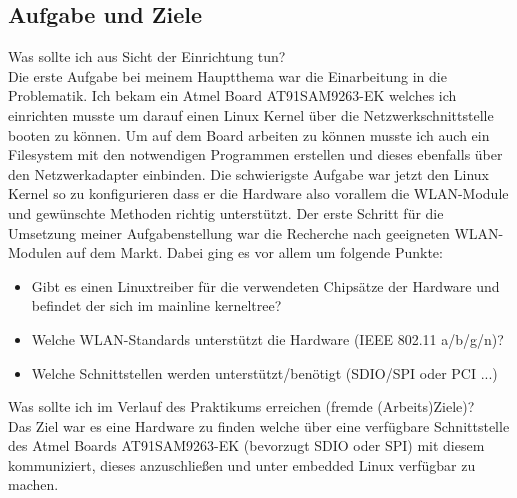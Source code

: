 \documentclass[pdftex,12pt,a4paper]{scrreprt}
\begin{document}
\subsection{Aufgabe und Ziele}
Was sollte ich aus Sicht der Einrichtung tun?\\
Die erste Aufgabe bei meinem Hauptthema war die Einarbeitung in die Problematik. Ich bekam ein Atmel Board AT91SAM9263-EK welches ich einrichten musste
um darauf einen Linux Kernel über die Netzwerkschnittstelle booten zu können. Um auf dem Board arbeiten zu können musste ich auch ein Filesystem mit den 
notwendigen Programmen erstellen und dieses ebenfalls über den Netzwerkadapter einbinden. Die schwierigste Aufgabe war jetzt den Linux Kernel so zu konfigurieren dass er die Hardware also vorallem die WLAN-Module und gewünschte Methoden richtig unterstützt.
Der erste Schritt für die Umsetzung meiner Aufgabenstellung war die Recherche nach geeigneten WLAN-Modulen auf dem Markt.
Dabei ging es vor allem um folgende Punkte:\\
\begin{itemize}
 \item Gibt es einen Linuxtreiber für die verwendeten Chipsätze der Hardware und befindet der sich im mainline kerneltree?
 \item Welche WLAN-Standards unterstützt die Hardware (IEEE 802.11 a/b/g/n)?
 \item Welche Schnittstellen werden unterstützt/benötigt (SDIO/SPI oder PCI ...)
\end{itemize}

Was sollte ich im Verlauf des Praktikums erreichen (fremde (Arbeits)Ziele)?\\
Das Ziel war es eine Hardware zu finden welche über eine verfügbare Schnittstelle des Atmel Boards AT91SAM9263-EK (bevorzugt SDIO oder SPI) mit diesem kommuniziert, dieses anzuschließen und unter embedded Linux verfügbar zu machen.
\end{document}
